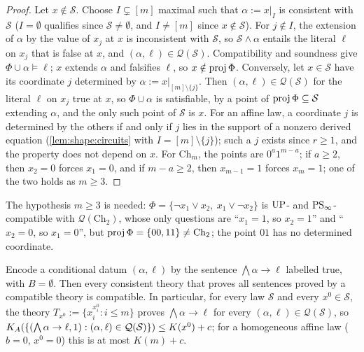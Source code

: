 \begin{proof}
Let $x\notin\mathcal S$. Choose $I\subsetneq[m]$ maximal such that $\alpha:=x|_I$ is consistent with $\mathcal S$ ($I=\emptyset$ qualifies since $\mathcal S\ne\emptyset$, and $I\ne[m]$ since $x\notin\mathcal S$). For $j\notin I$, the extension of $\alpha$ by the value of $x_j$ at $x$ is inconsistent with $\mathcal S$, so $\mathcal S\wedge\alpha$ entails the literal $\ell$ on $x_j$ that is false at $x$, and $(\alpha,\ell)\in\mathcal Q(\mathcal S)$. Compatibility and soundness give $\Phi\cup\alpha\models\ell$; $x$ extends $\alpha$ and falsifies $\ell$, so $x\notin\operatorname{proj}\Phi$. Conversely, let $x\in\mathcal S$ have its coordinate $j$ determined by $\alpha:=x|_{[m]\setminus\{j\}}$. Then $(\alpha,\ell)\in\mathcal Q(\mathcal S)$ for the literal $\ell$ on $x_j$ true at $x$, so $\Phi\cup\alpha$ is satisfiable, by a point of $\operatorname{proj}\Phi\subseteq\mathcal S$ extending $\alpha$, and the only such point of $\mathcal S$ is $x$.
For an affine law, a coordinate $j$ is determined by the others if and only if $j$ lies in the support of a nonzero derived equation (\cref{lem:shape:circuits} with $I=[m]\setminus\{j\}$); such a $j$ exists since $r\ge1$, and the property does not depend on $x$. For $\mathrm{Ch}_m$, the points are $0^a1^{m-a}$; if $a\ge2$, then $x_2=0$ forces $x_1=0$, and if $m-a\ge2$, then $x_{m-1}=1$ forces $x_m=1$; one of the two holds as $m\ge3$.
\end{proof}

The hypothesis $m\ge3$ is needed: $\Phi=\{\neg x_1\vee x_2,\ x_1\vee\neg x_2\}$ is $\mathrm{UP}$- and $\mathrm{PS}_\infty$-compatible with $\mathcal Q(\mathrm{Ch}_2)$, whose only questions are ``$x_1=1$, so $x_2=1$'' and ``$x_2=0$, so $x_1=0$'', but $\operatorname{proj}\Phi=\{00,11\}\ne\mathrm{Ch}_2$; the point $01$ has no determined coordinate.

\begin{proposition}\label{prop:shape:E2}
Encode a conditional datum $(\alpha,\ell)$ by the sentence $\bigwedge\alpha\to\ell$ labelled true, with $B=\emptyset$. Then every consistent theory that proves all sentences proved by a compatible theory is compatible. In particular, for every law $\mathcal S$ and every $x^0\in\mathcal S$, the theory $T_{x^0}:=\{x_i^{x^0_i}:i\le m\}$ proves $\bigwedge\alpha\to\ell$ for every $(\alpha,\ell)\in\mathcal Q(\mathcal S)$, so $K_{A}(\{(\bigwedge\alpha\to\ell,1):(\alpha,\ell)\in\mathcal Q(\mathcal S)\})\le K(x^0)+c$; for a homogeneous affine law ($b=0$, $x^0=0$) this is at most $K(m)+c$.
\end{proposition}

